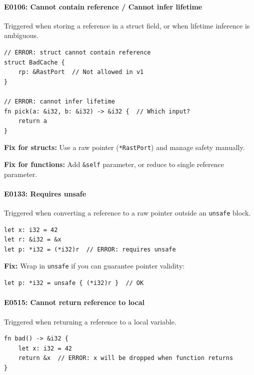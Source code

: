 \paragraph{E0106: Cannot contain reference / Cannot infer lifetime}

Triggered when storing a reference in a struct field, or when lifetime inference is ambiguous.

\begin{lstlisting}
// ERROR: struct cannot contain reference
struct BadCache {
    rp: &RastPort  // Not allowed in v1
}

// ERROR: cannot infer lifetime
fn pick(a: &i32, b: &i32) -> &i32 {  // Which input?
    return a
}
\end{lstlisting}

\textbf{Fix for structs:} Use a raw pointer (\texttt{*RastPort}) and manage safety manually.

\textbf{Fix for functions:} Add \texttt{\&self} parameter, or reduce to single reference parameter.

\paragraph{E0133: Requires unsafe}

Triggered when converting a reference to a raw pointer outside an \texttt{unsafe} block.

\begin{lstlisting}
let x: i32 = 42
let r: &i32 = &x
let p: *i32 = (*i32)r  // ERROR: requires unsafe
\end{lstlisting}

\textbf{Fix:} Wrap in \texttt{unsafe} if you can guarantee pointer validity:

\begin{lstlisting}
let p: *i32 = unsafe { (*i32)r }  // OK
\end{lstlisting}

\paragraph{E0515: Cannot return reference to local}

Triggered when returning a reference to a local variable.

\begin{lstlisting}
fn bad() -> &i32 {
    let x: i32 = 42
    return &x  // ERROR: x will be dropped when function returns
}
\end{lstlisting}

